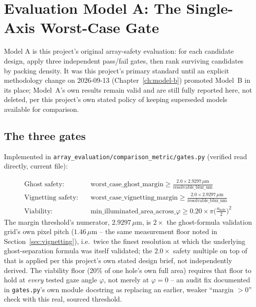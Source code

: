 \chapter{Evaluation Model A: The Single-Axis Worst-Case Gate}
\label{ch:model-a}

Model A is this project's original array-safety evaluation: for each candidate design,
apply three independent pass/fail gates, then rank surviving candidates by packing
density. It was this project's primary standard until an explicit methodology change on
2026-09-13 (Chapter~\ref{ch:model-b}) promoted Model~B in its place; Model~A's own
results remain valid and are still fully reported here, not deleted, per this project's
own stated policy of keeping superseded models available for comparison.

\section{The three gates}
\label{sec:three-gates}
Implemented in \texttt{array\_evaluation/comparison\_metric/gates.py} (verified read
directly, current file):

\begin{align}
\text{Ghost safety:}\quad & \text{worst\_case\_ghost\_margin} \ge
\frac{2.0\times2.9297\,\mu\mathrm{m}}{\text{resolvable\_blur\_um}} \\
\text{Vignetting safety:}\quad & \text{worst\_case\_vignetting\_margin} \ge
\frac{2.0\times2.9297\,\mu\mathrm{m}}{\text{resolvable\_blur\_um}} \\
\text{Viability:}\quad & \text{min\_illuminated\_area\_across\_}\varphi \ge
0.20\times\pi\Big(\frac{a_{\mathrm{hole}}}{2}\Big)^2
\end{align}
The margin threshold's numerator, $2.9297\,\mu$m, is $2\times$ the ghost-formula
validation grid's own pixel pitch ($1.46\,\mu$m -- the same measurement floor noted in
Section~\ref{sec:vignetting}), i.e.\ twice the finest resolution at which the underlying
ghost-separation formula was itself validated; the $2.0\times$ safety multiple on top of
that is applied per this project's own stated design brief, not independently derived.
The viability floor (20\% of one hole's own full area) requires that floor to hold at
\emph{every} tested gaze angle $\varphi$, not merely at $\varphi=0$ -- an audit fix
documented in \texttt{gates.py}'s own module docstring as replacing an earlier, weaker
``margin $>0$'' check with this real, sourced threshold.

